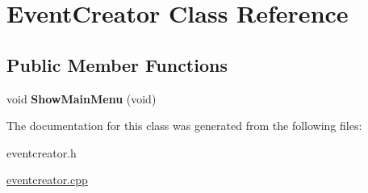 \hypertarget{classEventCreator}{\section{\-Event\-Creator \-Class \-Reference}
\label{classEventCreator}
}
\subsection*{\-Public \-Member \-Functions}
\begin{DoxyCompactItemize}
\item 
\hypertarget{classEventCreator_a0b1f77352fb2ee059087e319ec1c007d}{void {\bfseries \-Show\-Main\-Menu} (void)}\label{classEventCreator_a0b1f77352fb2ee059087e319ec1c007d}

\end{DoxyCompactItemize}


\-The documentation for this class was generated from the following files\-:\begin{DoxyCompactItemize}
\item 
eventcreator.\-h\item 
\hyperlink{eventcreator_8cpp}{eventcreator.\-cpp}\end{DoxyCompactItemize}
